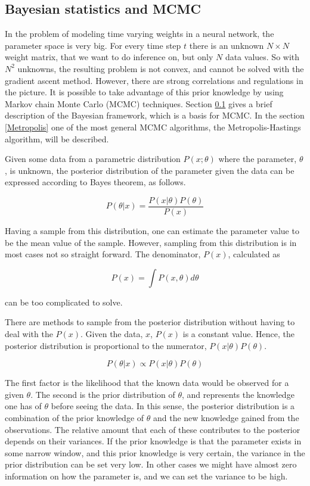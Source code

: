 \subsection{Bayesian statistics and MCMC}
\label{Bayesian}

In the problem of modeling time varying weights in a neural network, the parameter space is very big. For every time step $t$ there is an unknown $N \times N$ weight matrix, that we want to do inference on, but only $N$ data values. So with $N^2$ unknowns, the resulting problem is not convex, and cannot be solved with the gradient ascent method. However, there are strong correlations and regulations in the picture. It is possible to take advantage of this prior knowledge by using Markov chain Monte Carlo (MCMC) techniques. Section \ref{Bayesian} gives a brief description of the Bayesian framework, which is a basis for MCMC. In the section \ref{Metropolis} one of the most general MCMC algorithms, the  Metropolis-Hastings algorithm, will be described.

Given some data from a parametric distribution $P(x;\theta)$ where the parameter, $\theta$, is unknown, the posterior distribution of the parameter given the data can be expressed according to Bayes theorem, as follows.

\begin{equation}
    P(\theta | x) = \frac{P(x|\theta)P(\theta)}{P(x)}
\end{equation}

Having a sample from this distribution, one can estimate the parameter value to be the mean value of the sample. However, sampling from this distribution is in most cases not so straight forward. The denominator, $P(x)$, calculated as

\begin{equation}
    P(x) = \int P(x,\theta)d\theta
\end{equation}

can be too complicated to solve. 

There are methods to sample from the posterior distribution without having to deal with the $P(x)$. Given the data, $x$, $P(x)$ is a constant value. Hence, the posterior distribution is proportional to the numerator, $P(x|\theta)P(\theta)$. 

\begin{equation}
    P(\theta | x) \propto P(x|\theta)P(\theta)
\end{equation}

 The first factor is the likelihood that the known data would be observed for a given $\theta$. The second is the prior distribution of $\theta$, and represents the knowledge one has of $\theta$ before seeing the data. In this sense, the posterior distribution is a combination of the prior knowledge of $\theta$ and the new knowledge gained from the observations. The relative amount that each of these contributes to the posterior depends on their variances. If the prior knowledge is that the parameter exists in some narrow window, and this prior knowledge is very certain, the variance in the prior distribution can be set very low. In other cases we might have almost zero information on how the parameter is, and we can set the variance to be high. 

